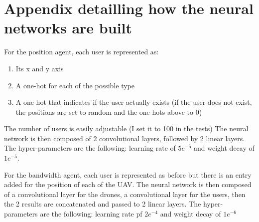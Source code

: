\documentclass[letterpaper]{article}
\begin{document}




\appendix

\section{Appendix detailling how the neural networks are built}

For the position agent, each user is represented as:
\begin{enumerate}
    \item Its x and y axis
    \item A one-hot for each of the possible type
    \item A one-hot that indicates if the user actually exists (if the user does not exist, the positions are set to random and the one-hots above to 0)
\end{enumerate}

The number of users is easily adjustable (I set it to 100 in the tests)
The neural network is then composed of 2 convolutional layers, followed by 2 linear layers.
The hyper-parameters are the following: learning rate of $5e^{-5}$ and weight decay of $1e^{-5}$.

\;

For the bandwidth agent, each user is represented as before but there is an entry added for the position of each of the UAV.
The neural network is then composed of a convolutional layer for the drones, a convolutional layer for the users,
then the 2 results are concatenated and passed to 2 linear layers.
The hyper-parameters are the following: learning rate pf $2e^{-4}$ and weight decay of $1e^{-6}$
\end{document}
